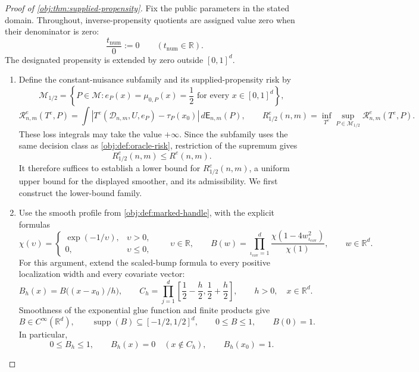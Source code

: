 \begin{proof}[Proof of \cref{obj:thm:supplied-propensity}]
Fix the public parameters in the stated domain. Throughout, inverse-propensity quotients are assigned value zero when their denominator is zero:
\[
\frac{t_{\mathrm{num}}}{0}:=0
\qquad(t_{\mathrm{num}}\in\mathbb R).
\]
The designated propensity is extended by zero outside \([0,1]^d\).

\begin{enumerate}
\item Define the constant-nuisance subfamily and its supplied-propensity risk by
\[
\mathcal M_{1/2}
=
\left\{
P\in\mathcal M:
e_P(x)=\mu_{0,P}(x)=\frac12
\text{ for every }x\in[0,1]^d
\right\},
\]
\[
\mathcal R^e_{n,m}(T^e,P)
=
\int
\left|T^e(\mathcal D_{n,m},U,e_P)-\tau_P(x_0)\right|
\,d\mathsf E_{n,m}(P),
\qquad
R^e_{1/2}(n,m)
=
\inf_{T^e}\sup_{P\in\mathcal M_{1/2}}
\mathcal R^e_{n,m}(T^e,P).
\]
These loss integrals may take the value \(+\infty\). Since the subfamily uses the same decision class as \cref{obj:def:oracle-risk}, restriction of the supremum gives
\[
R^e_{1/2}(n,m)\le R^e(n,m).
\]
It therefore suffices to establish a lower bound for \(R^e_{1/2}(n,m)\), a uniform upper bound for the displayed smoother, and its admissibility. We first construct the lower-bound family.

\item Use the smooth profile from \cref{obj:def:marked-handle}, with the explicit formulas
\[
\chi(\upsilon)=
\begin{cases}
\exp(-1/\upsilon),&\upsilon>0,\\
0,&\upsilon\le0,
\end{cases}
\qquad \upsilon\in\mathbb R,
\qquad
B(w)=\prod_{\iota_{\mathrm{cov}}=1}^d\frac{\chi(1-4w_{\iota_{\mathrm{cov}}}^2)}{\chi(1)},
\qquad w\in\mathbb R^d.
\]
For this argument, extend the scaled-bump formula to every positive localization width and every covariate vector:
\[
B_h(x)=B\bigl((x-x_0)/h\bigr),
\qquad
C_h=\prod_{j=1}^d
\left[\frac12-\frac h2,\frac12+\frac h2\right],
\qquad h>0,\quad x\in\mathbb R^d.
\]
Smoothness of the exponential glue function and finite products give
\[
B\in C^\infty(\mathbb R^d),
\qquad
\operatorname{supp}(B)\subseteq[-1/2,1/2]^d,
\qquad
0\le B\le1,
\qquad
B(0)=1.
\]
In particular,
\[
0\le B_h\le1,\qquad
B_h(x)=0\quad(x\notin C_h),\qquad
B_h(x_0)=1.
\]


\end{enumerate}
\end{proof}
